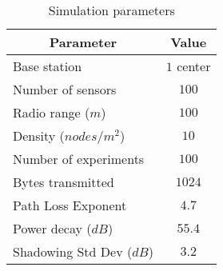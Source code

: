 \begin{table}[!ht]
\normalsize
\caption{Simulation parameters}
\label{tab:param}
\centering

\begin{tabular}{l|c}
\hline
\multicolumn{1}{c|}{\textbf{Parameter}} & \textbf{Value}  \\ \hline
Base station                            & $1$ center        \\
Number of sensors                       & $100$             \\
Radio range ($m$)                         & $100$          \\
Density ($nodes/m^2$)                   & $10$ \\
Number of experiments                   & $100$ \\
Bytes transmitted                       & $1024$ \\
Path Loss Exponent                      & $4.7$\\
Power decay ($dB$)                        & $55.4$\\
Shadowing Std Dev ($dB$)       			& $3.2$\\
\end{tabular}

\end{table}